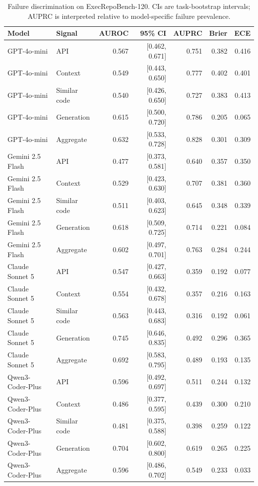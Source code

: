 \begin{table}[t]
\centering
\scriptsize
\caption{Failure discrimination on ExecRepoBench-120. CIs are task-bootstrap intervals; AUPRC is interpreted relative to model-specific failure prevalence.}
\label{tab:uncertainty_discrimination_final}
\begin{tabular}{llrrrrr}
\toprule
Model & Signal & AUROC & 95\% CI & AUPRC & Brier & ECE \\
\midrule
GPT-4o-mini & API & 0.567 & [0.462, 0.671] & 0.751 & 0.382 & 0.416 \\
GPT-4o-mini & Context & 0.549 & [0.443, 0.650] & 0.777 & 0.402 & 0.401 \\
GPT-4o-mini & Similar code & 0.540 & [0.426, 0.650] & 0.727 & 0.383 & 0.413 \\
GPT-4o-mini & Generation & 0.615 & [0.500, 0.720] & 0.786 & 0.205 & 0.065 \\
GPT-4o-mini & Aggregate & 0.632 & [0.533, 0.728] & 0.828 & 0.301 & 0.309 \\
\midrule
Gemini 2.5 Flash & API & 0.477 & [0.373, 0.581] & 0.640 & 0.357 & 0.350 \\
Gemini 2.5 Flash & Context & 0.529 & [0.423, 0.630] & 0.707 & 0.381 & 0.360 \\
Gemini 2.5 Flash & Similar code & 0.511 & [0.403, 0.623] & 0.645 & 0.348 & 0.339 \\
Gemini 2.5 Flash & Generation & 0.618 & [0.509, 0.725] & 0.714 & 0.221 & 0.084 \\
Gemini 2.5 Flash & Aggregate & 0.602 & [0.497, 0.701] & 0.763 & 0.284 & 0.244 \\
\midrule
Claude Sonnet 5 & API & 0.547 & [0.427, 0.663] & 0.359 & 0.192 & 0.077 \\
Claude Sonnet 5 & Context & 0.554 & [0.432, 0.678] & 0.357 & 0.216 & 0.163 \\
Claude Sonnet 5 & Similar code & 0.563 & [0.443, 0.683] & 0.316 & 0.192 & 0.061 \\
Claude Sonnet 5 & Generation & 0.745 & [0.646, 0.835] & 0.492 & 0.296 & 0.365 \\
Claude Sonnet 5 & Aggregate & 0.692 & [0.583, 0.795] & 0.489 & 0.193 & 0.135 \\
\midrule
Qwen3-Coder-Plus & API & 0.596 & [0.492, 0.697] & 0.511 & 0.244 & 0.132 \\
Qwen3-Coder-Plus & Context & 0.486 & [0.377, 0.595] & 0.439 & 0.300 & 0.210 \\
Qwen3-Coder-Plus & Similar code & 0.481 & [0.375, 0.588] & 0.398 & 0.259 & 0.122 \\
Qwen3-Coder-Plus & Generation & 0.704 & [0.602, 0.800] & 0.619 & 0.265 & 0.225 \\
Qwen3-Coder-Plus & Aggregate & 0.596 & [0.486, 0.702] & 0.549 & 0.233 & 0.033 \\
\bottomrule
\end{tabular}
\end{table}
